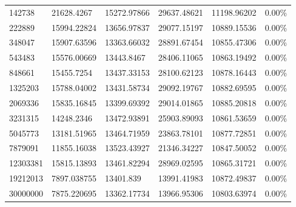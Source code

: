 \documentclass[12pt]{article} %
\begin{document}
\begin{table}[]
{\begin{tabular}{@{}llllll@{}}
142738 & 21628.4267 & 15272.97866 & 29637.48621 & 11198.96202 & 0.00\% \\
222889 & 15994.22824 & 13656.97837 & 29077.15197 & 10889.15536 & 0.00\% \\
348047 & 15907.63596 & 13363.66032 & 28891.67454 & 10855.47306 & 0.00\% \\
543483 & 15576.00669 & 13443.8467 & 28406.11065 & 10863.19492 & 0.00\% \\
848661 & 15455.7254 & 13437.33153 & 28100.62123 & 10878.16443 & 0.00\% \\
1325203 & 15788.04002 & 13431.58734 & 29092.19767 & 10882.69595 & 0.00\% \\
2069336 & 15835.16845 & 13399.69392 & 29014.01865 & 10885.20818 & 0.00\% \\
3231315 & 14248.2346 & 13472.93891 & 25903.89093 & 10861.53659 & 0.00\% \\
5045773 & 13181.51965 & 13464.71959 & 23863.78101 & 10877.72851 & 0.00\% \\
7879091 & 11855.16038 & 13523.43927 & 21346.34227 & 10847.50052 & 0.00\% \\
12303381 & 15815.13893 & 13461.82294 & 28969.02595 & 10865.31721 & 0.00\% \\
19212013 & 7897.038755 & 13401.839 & 13991.41983 & 10872.49837 & 0.00\% \\
30000000 & 7875.220695 & 13362.17734 & 13966.95306 & 10803.63974 & 0.00\% \\ \bottomrule
\end{tabular}%
}
\end{table}
\end{document}
